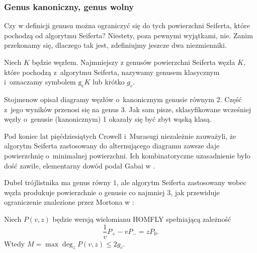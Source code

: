 
\subsubsection{Genus kanoniczny, genus wolny}
Czy w definicji genusu można ograniczyć się do tych powierzchni Seiferta, które pochodzą od algorytmu Seiferta?
%
Niestety, poza pewnymi wyjątkami, nie.
Zanim przekonamy się, dlaczego tak jest, zdefiniujmy jeszcze dwa niezmienniki.

\begin{definition}
%
    Niech $K$ będzie węzłem.
    Najmniejszy z genusów powierzchni Seiferta węzła $K$, które pochodzą z~algorytmu Seiferta, nazywamy genusem klasycznym i~oznaczamy symbolem $\operatorname{g_c} K$ lub krótko $g_c$.
\end{definition}

Stojmenow \cite{stoimenow08} opisał diagramy węzłów o~kanonicznym genusie równym 2.
%
Część z~jego wyników przenosi się na genus 3.
Jak sam pisze, sklasyfikowane wcześniej węzły o~genusie (kanonicznym) 1 okazały się być zbyt wąską klasą.

Pod koniec lat pięćdziesiątych Crowell i~Murasugi niezależnie zauważyli, że algorytm Seiferta zastosowany do alternującego diagramu zawsze daje powierzchnię o~minimalnej powierzchni.
%
%
Ich kombinatoryczne uzasadnienie było dość zawiłe, elementarny dowód podał Gabai w \cite{gabai86}.
%

Dubel trójlistnika ma genus równy $1$, ale algorytm Seiferta zastosowany wobec węzła produkuje powierzchnie o genusie co najmniej $3$, jak przewiduje ograniczenie znalezione przez Mortona w \cite[twierdzenie 2]{morton86}:
%

\begin{proposition}
    Niech $P(v, z)$ będzie wersją wielomianu HOMFLY spełniającą zależność
    \begin{equation}
        \frac 1v P_+ - vP_- = zP_0.
    \end{equation}
    Wtedy $M = \max \deg_z P(v, z) \le 2g_c$.
\end{proposition}

